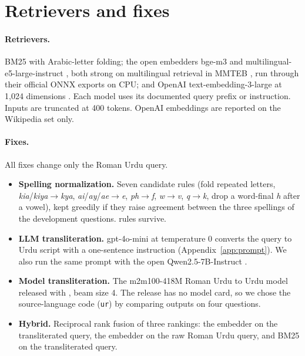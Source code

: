 \documentclass[11pt]{article}
\begin{document}
\section{Retrievers and fixes}

\paragraph{Retrievers.} BM25 \citep{robertson2009bm25} with Arabic-letter folding; the open embedders bge-m3 \citep{chen2024bgem3} and multilingual-e5-large-instruct \citep{wang2024me5}, both strong on multilingual retrieval in MMTEB \citep{enevoldsen2025mmteb}, run through their official ONNX exports on CPU; and OpenAI text-embedding-3-large at 1{,}024 dimensions \citep{openai2024embeddings}. Each model uses its documented query prefix or instruction. Inputs are truncated at 400 tokens. OpenAI embeddings are reported on the Wikipedia set only.

\paragraph{Fixes.} All fixes change only the Roman Urdu query.
\begin{itemize}
\item \textbf{Spelling normalization.} Seven candidate rules (fold repeated letters, \textit{kia}/\textit{kiya}$\rightarrow$\textit{kya}, \textit{ai}/\textit{ay}/\textit{ae}$\rightarrow$\textit{e}, \textit{ph}$\rightarrow$\textit{f}, \textit{w}$\rightarrow$\textit{v}, \textit{q}$\rightarrow$\textit{k}, drop a word-final \textit{h} after a vowel), kept greedily if they raise agreement between the three spellings of the development questions. \WikiNRules{} rules survive.
\item \textbf{LLM transliteration.} gpt-4o-mini at temperature 0 converts the query to Urdu script with a one-sentence instruction (Appendix~\ref{app:prompt}). We also run the same prompt with the open Qwen2.5-7B-Instruct \citep{qwen2025qwen25}.
\item \textbf{Model transliteration.} The m2m100-418M Roman Urdu to Urdu model released with \citet{butt2025translit}, beam size 4. The release has no model card, so we chose the source-language code (\texttt{ur}) by comparing outputs on four questions.
\item \textbf{Hybrid.} Reciprocal rank fusion \citep{cormack2009rrf} of three rankings: the embedder on the transliterated query, the embedder on the raw Roman Urdu query, and BM25 on the transliterated query.
\end{itemize}
\end{document}
